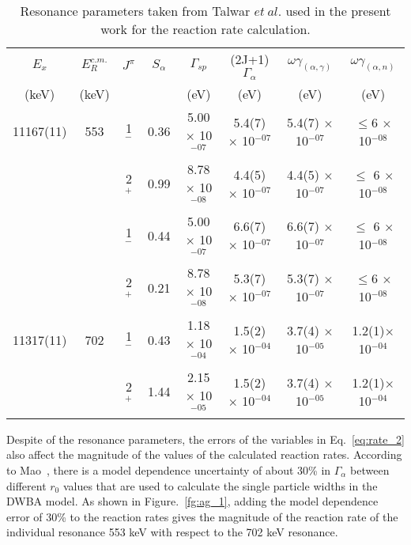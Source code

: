 \begin{table}[tpb]
    \setlength{\capwidth}{0.7\textwidth}
    \begin{centering}
       \caption{Resonance parameters taken from Talwar $et\ al.$\citep{Rashi2016} used in the present work for the reaction rate calculation. }
       \label{tb:rate_para}
       \begin{tabular}{c c c c c c c c}
       \toprule
       \toprule
              $E_x$        &    $E_R^{c.m.}$ &  $J^{\pi}$  &  $S_{\alpha}$   &    $\Gamma_{sp}$     &   (2J+1)$\Gamma_\alpha$     &    $\omega\gamma_{(\alpha,\gamma)}$  & $\omega\gamma_{(\alpha,n)}$           \\
              (keV)        &    (keV)       &     &    &  (eV)   &   (eV)  &  (eV)  &   (eV)   \\
             \hline
            11167(11)       &    553         &   1$^-$  &  0.36   & 5.00 $\times$ 10$^{-07}$   & 5.4(7) $\times$ 10$^{-07}$  & 5.4(7) $\times$ 10$^{-07}$ & $\leq$6 $\times$ 10$^{-08}$   \\
                           &                &   2$^+$  &  0.99   & 8.78 $\times$ 10$^{-08}$   & 4.4(5) $\times$ 10$^{-07}$  & 4.4(5) $\times$ 10$^{-07}$ & $\leq$ 6 $\times$ 10$^{-08}$   \\
                            &                 &   1$^-$  &  0.44   & 5.00 $\times$ 10$^{-07}$   & 6.6(7) $\times$ 10$^{-07}$  & 6.6(7) $\times$ 10$^{-07}$ &$\leq$ 6 $\times$ 10$^{-08}$   \\
                            &                &   2$^+$  &  0.21   & 8.78 $\times$ 10$^{-08}$   & 5.3(7) $\times$ 10$^{-07}$  & 5.3(7) $\times$ 10$^{-07}$ & $\leq$6 $\times$ 10$^{-08}$   \\
               11317(11)       &    702        &   1$^-$  &  0.43   & 1.18 $\times$ 10$^{-04}$   & 1.5(2) $\times$ 10$^{-04}$  & 3.7(4) $\times$ 10$^{-05}$ & 1.2(1)$\times$ 10$^{-04}$   \\
                            &                  &   2$^+$  &  1.44   & 2.15 $\times$ 10$^{-05}$   & 1.5(2) $\times$ 10$^{-04}$  & 3.7(4) $\times$ 10$^{-05}$ & 1.2(1)$\times$ 10$^{-04}$   \\

             \hline
         \hline
       \end{tabular}
     \end{centering}
\end{table}

Despite of the resonance parameters, the errors of the variables in Eq.~\ref{eq:rate_2} also affect the magnitude of the values of the calculated reaction rates. According to  Mao~\cite{Mao1996}, there is a model dependence uncertainty of about 30\%  in $\Gamma_\alpha$ between  different $r_0$ values that are used to calculate the single particle widths in the DWBA model. As shown in Figure.~\ref{fg:ag_1}, adding the model dependence error of 30\% to the reaction rates gives the magnitude of the reaction rate of the individual resonance 553 keV with respect to the 702 keV resonance.

